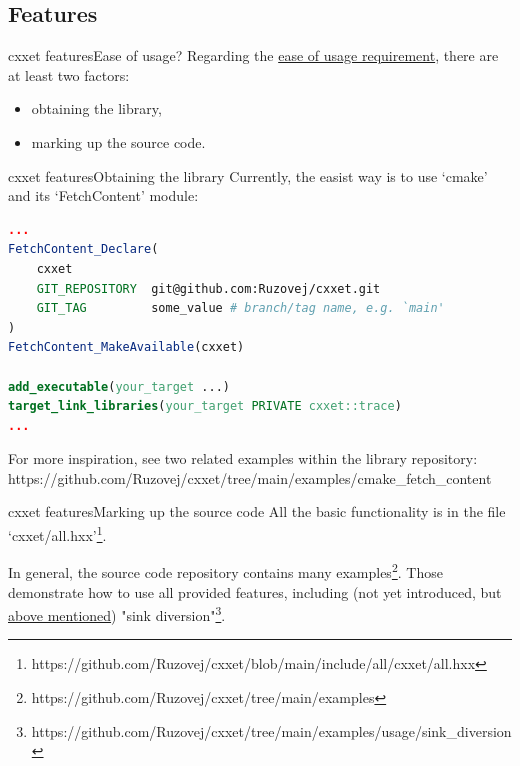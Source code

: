 \documentclass[aspectratio=169]{beamer}
\begin{document}
\subsection{Features}

\begin{frame}{cxxet features}{Ease of usage?}
    Regarding the \hyperlink{easy_usage}{ease of usage requirement}, there are at least two factors:

    \begin{itemize}
        \item obtaining the library,
        \item marking up the source code.
    \end{itemize}

\end{frame}

\begin{frame}[fragile]{cxxet features}{Obtaining the library}
    Currently, the easist way is to use `cmake' and its `FetchContent' module:

    \begin{lstlisting}[language=cmake]
...
FetchContent_Declare(
    cxxet
    GIT_REPOSITORY  git@github.com:Ruzovej/cxxet.git
    GIT_TAG         some_value # branch/tag name, e.g. `main'
)
FetchContent_MakeAvailable(cxxet)

add_executable(your_target ...)
target_link_libraries(your_target PRIVATE cxxet::trace)
...
    \end{lstlisting}

    For more inspiration, see two related examples within the library repository: https://github.com/Ruzovej/cxxet/tree/main/examples/cmake\_fetch\_content

\end{frame}

\begin{frame}{cxxet features}{Marking up the source code}
    All the basic functionality is in the file `cxxet/all.hxx'\footnote{https://github.com/Ruzovej/cxxet/blob/main/include/all/cxxet/all.hxx}.

    In general, the source code repository contains many examples\footnote{https://github.com/Ruzovej/cxxet/tree/main/examples}. Those demonstrate how to use all provided features, including (not yet introduced, but \hyperlink{fork_handling}{above mentioned}) "sink diversion"\footnote{https://github.com/Ruzovej/cxxet/tree/main/examples/usage/sink\_diversion}.

\end{frame}
\end{document}
